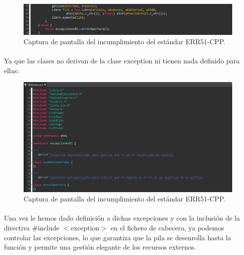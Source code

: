 			\begin{figure}[H]
				\centering
				\includegraphics[scale=0.8]{img/img9.png}
				\caption{Captura de pantalla del incumplimiento del estándar ERR51-CPP.}
				\label{img9}
			\end{figure}
			
			\paragraph{}Ya que las clases no derivan de la clase exception ni tienen nada definido para ellas:
			
			\begin{figure}[H]
				\centering
				\includegraphics[scale=0.8]{img/img10.png}
				\caption{Captura de pantalla del incumplimiento del estándar ERR51-CPP.}
				\label{img10}
			\end{figure}
			
			\paragraph{}Una vez le hemos dado definición a dichas excepciones y con la inclusión de la directiva $\#$include $<$exception$>$ en el fichero de cabecera, ya podemos controlar las excepciones, lo que garantiza que la pila se desenrolla hasta la función y permite una gestión elegante de los recursos externos.
			
